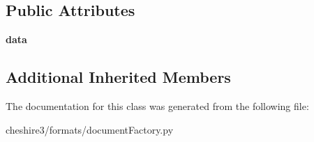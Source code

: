 \subsection*{Public Attributes}
\begin{DoxyCompactItemize}
\item 
\hypertarget{classcheshire3_1_1formats_1_1document_factory_1_1_report_lab_accumulating_stream_ae83055f111ef632effee9cd9eba8beb3}{{\bfseries data}}\label{classcheshire3_1_1formats_1_1document_factory_1_1_report_lab_accumulating_stream_ae83055f111ef632effee9cd9eba8beb3}

\end{DoxyCompactItemize}
\subsection*{Additional Inherited Members}


The documentation for this class was generated from the following file\-:\begin{DoxyCompactItemize}
\item 
cheshire3/formats/document\-Factory.\-py\end{DoxyCompactItemize}
